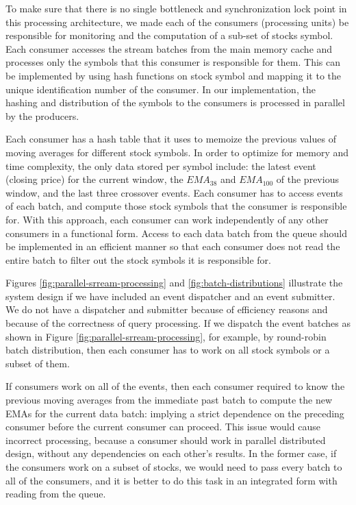 To make sure that there is no single bottleneck and synchronization lock point in this processing architecture, we made each of the consumers
(processing units) be responsible for monitoring and the computation of a sub-set of stocks symbol. Each consumer accesses the stream batches from the main memory cache and processes only the symbols that this consumer is responsible for them. This can be implemented by using hash functions on stock symbol and mapping it to the unique identification number of the consumer.
In our implementation, the hashing and distribution of the symbols to the consumers is processed in parallel by the producers.

Each consumer has a hash table that it uses to memoize the previous values of moving averages for different stock symbols.
In order to optimize for memory and time complexity, the only data stored per symbol include: the latest event (closing price) for the current window, the $EMA_{38}$ and $EMA_{100}$ of the previous window, and the last three crossover events.
Each consumer has to access events of each batch, and compute those stock symbols that the consumer is responsible for. With this approach, each consumer can work independently of any other consumers in a functional form. Access to each data batch from the queue should be implemented in an efficient manner so that each consumer does not read the entire batch to filter out the stock symbols it is responsible for.

Figures \ref{fig:parallel-srream-processing} and \ref{fig:batch-distributions} illustrate the system design if we have included an event dispatcher and an event submitter. We do not have a dispatcher and submitter because of efficiency reasons and because of the correctness of query processing.
If we dispatch the event batches as shown in Figure \ref{fig:parallel-srream-processing}, for example, by round-robin batch distribution, then each consumer has to work on all stock symbols or a subset of them.

If consumers work on all of the events, then each consumer required to know the previous moving averages from the immediate past batch to compute the new EMAs for the current data batch: implying a strict dependence on the preceding consumer before the current consumer can proceed.
This issue would cause incorrect processing, because a consumer should work in parallel distributed design, without any dependencies on each other's results.
In the former case, if the consumers work on a subset of stocks, we would need to pass every batch to all of the consumers, and it is better to do this task in an integrated form with reading from the queue.



